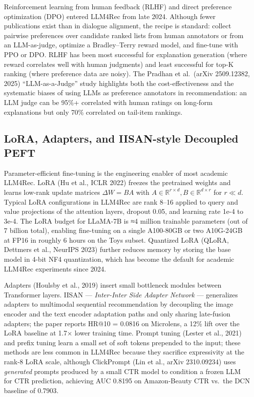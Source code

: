 \documentclass{article}
\begin{document}
Reinforcement learning from human feedback (RLHF) and direct preference optimization (DPO) entered LLM4Rec from late 2024. Although fewer publications exist than in dialogue alignment, the recipe is standard: collect pairwise preferences over candidate ranked lists from human annotators or from an LLM-as-judge, optimize a Bradley--Terry reward model, and fine-tune with PPO or DPO. RLHF has been most successful for explanation generation (where reward correlates well with human judgments) and least successful for top-K ranking (where preference data are noisy). The Pradhan et al.~(arXiv 2509.12382, 2025) ``LLM-as-a-Judge'' study highlights both the cost-effectiveness and the systematic biases of using LLMs as preference annotators in recommendation: an LLM judge can be 95\%+ correlated with human ratings on long-form explanations but only 70\% correlated on tail-item rankings.

\subsection{LoRA, Adapters, and IISAN-style Decoupled PEFT}\label{lora-adapters-and-iisan-style-decoupled-peft}

Parameter-efficient fine-tuning is the engineering enabler of most academic LLM4Rec. LoRA (Hu et al., ICLR 2022) freezes the pretrained weights and learns low-rank update matrices \(\Delta W = BA\) with \(A \in \mathbb{R}^{r \times d}, B \in \mathbb{R}^{d \times r}\) for \(r \ll d\). Typical LoRA configurations in LLM4Rec are rank 8--16 applied to query and value projections of the attention layers, dropout 0.05, and learning rate 1e-4 to 3e-4. The LoRA budget for LLaMA-7B is ≈4 million trainable parameters (out of 7 billion total), enabling fine-tuning on a single A100-80GB or two A10G-24GB at FP16 in roughly 6 hours on the Toys subset. Quantized LoRA (QLoRA, Dettmers et al., NeurIPS 2023) further reduces memory by storing the base model in 4-bit NF4 quantization, which has become the default for academic LLM4Rec experiments since 2024.

Adapters (Houlsby et al., 2019) insert small bottleneck modules between Transformer layers. IISAN \citep{fu2024iisanefficientlyad} --- \emph{Inter-Inter Side Adapter Network} --- generalizes adapters to multimodal sequential recommendation by decoupling the image encoder and the text encoder adaptation paths and only sharing late-fusion adapters; the paper reports HR@10 = 0.0816 on Microlens, a 12\% lift over the LoRA baseline at 1.7× lower training time. Prompt tuning (Lester et al., 2021) and prefix tuning \citep{li2020wsdm2020} learn a small set of soft tokens prepended to the input; these methods are less common in LLM4Rec because they sacrifice expressivity at the rank-8 LoRA scale, although ClickPrompt (Lin et al., arXiv 2310.09234) uses \emph{generated} prompts produced by a small CTR model to condition a frozen LLM for CTR prediction, achieving AUC 0.8195 on Amazon-Beauty CTR vs.~the DCN baseline of 0.7903.
\end{document}
